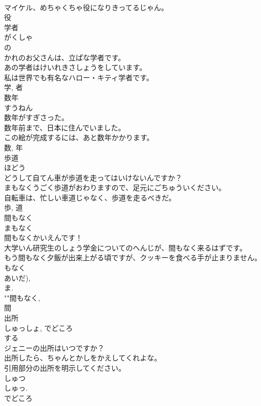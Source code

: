 \documentclass[8pt]{extreport}
\begin{document}
\begin{CJK}{UTF8}{min}
\\	マイケル、めちゃくちゃ役になりきってるじゃん。	
\\	役	
\\	学者	
\\	がくしゃ	
\\	の 
\\	かれのお父さんは、立ぱな学者です。	
\\	あの学者はけいれきさしょうをしています。	
\\	私は世界でも有名なハロー・キティ学者です。	
\\	学, 者	
\\	数年	
\\	すうねん	
\\	数年がすぎさった。	
\\	数年前まで、日本に住んでいました。	
\\	この絵が完成するには、あと数年かかります。	
\\	数, 年	
\\	歩道	
\\	ほどう	
\\	どうして自てん車が歩道を走ってはいけないんですか？	
\\	まもなくうごく歩道がおわりますので、足元にごちゅういください。	
\\	自転車は、忙しい車道じゃなく、歩道を走るべきだ。	
\\	歩, 道	
\\	間もなく	
\\	まもなく	
\\	間もなくかいえんです！	
\\	大学いん研究生のしょう学金についてのへんじが、間もなく来るはずです。	
\\	もう間もなく夕飯が出来上がる頃ですが、クッキーを食べる手が止まりません。	
\\	もなく 
\\	あいだ), 
\\	ま. 
\\	""間もなく, 
\\	間	
\\	出所	
\\	しゅっしょ, でどころ	
\\	する 
\\	ジェニーの出所はいつですか？	
\\	出所したら、ちゃんとかしをかえしてくれよな。	
\\	引用部分の出所を明示してください。	
\\	しゅつ 
\\	しゅっ. 
\\	でどころ 

\end{CJK}
\end{document}

